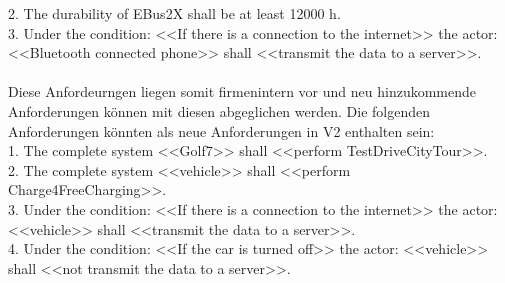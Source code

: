 \documentclass[12pt]{report}
\begin{document}
2. The durability of EBus2X shall be at least 12000 h.\\

3. Under the condition: <<If there is a connection to the internet>> the actor: <<Bluetooth connected phone>> shall <<transmit the data to a server>>.\\
\\

Diese Anfordeurngen liegen somit firmenintern vor und neu hinzukommende Anforderungen können mit diesen abgeglichen werden. Die folgenden Anforderungen könnten als neue Anforderungen in V2 enthalten sein:\\

1. The complete system <<Golf7>> shall <<perform TestDriveCityTour>>.\\

2. The complete system <<vehicle>> shall <<perform Charge4FreeCharging>>.\\

3. Under the condition: <<If there is a connection to the internet>> the actor: <<vehicle>> shall <<transmit the data to a server>>.\\

4. Under the condition: <<If the car is turned off>> the actor: <<vehicle>> shall <<not transmit the data to a server>>.\\
\\
\end{document}
